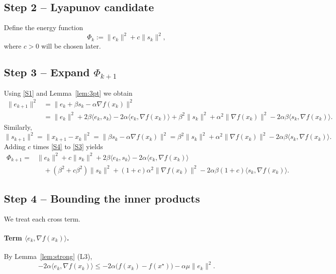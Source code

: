 \documentclass{article}
\begin{document}
\subsection*{Step 2 – Lyapunov candidate}
Define the energy function
\begin{equation}
\Phi_{k}:= \|e_{k}\|^{2}+c\|s_{k}\|^{2},
\tag{S2}
\end{equation}
where $c>0$ will be chosen later.

\subsection*{Step 3 – Expand $\Phi_{k+1}$}
Using \eqref{S1} and Lemma~\ref{lem:3pt} we obtain
\begin{align}
\|e_{k+1}\|^{2}
&=\|e_{k}+\beta s_{k}-\alpha\nabla f(x_{k})\|^{2} \nonumber\\
&=\|e_{k}\|^{2}+2\beta\langle e_{k},s_{k}\rangle
   -2\alpha\langle e_{k},\nabla f(x_{k})\rangle
   +\beta^{2}\|s_{k}\|^{2}
   +\alpha^{2}\|\nabla f(x_{k})\|^{2}
   -2\alpha\beta\langle s_{k},\nabla f(x_{k})\rangle .
\tag{S3}
\end{align}
Similarly,
\begin{equation}
\|s_{k+1}\|^{2}=\|x_{k+1}-x_{k}\|^{2}
           =\| \beta s_{k}-\alpha\nabla f(x_{k})\|^{2}
           =\beta^{2}\|s_{k}\|^{2}+\alpha^{2}\|\nabla f(x_{k})\|^{2}
            -2\alpha\beta\langle s_{k},\nabla f(x_{k})\rangle .
\tag{S4}
\end{equation}
Adding $c$ times \eqref{S4} to \eqref{S3} yields
\begin{align}
\Phi_{k+1}
=&\|e_{k}\|^{2}+c\|s_{k}\|^{2}
   +2\beta\langle e_{k},s_{k}\rangle
   -2\alpha\langle e_{k},\nabla f(x_{k})\rangle  \nonumber\\
&\quad+(\beta^{2}+c\beta^{2})\|s_{k}\|^{2}
   +(1+c)\alpha^{2}\|\nabla f(x_{k})\|^{2}
   -2\alpha\beta(1+c)\langle s_{k},\nabla f(x_{k})\rangle .
\tag{S5}
\end{align}

\subsection*{Step 4 – Bounding the inner products}
We treat each cross term.

\paragraph{Term $\langle e_{k},\nabla f(x_{k})\rangle$.}
By Lemma~\ref{lem:strong} (L3),
\begin{equation}
-2\alpha\langle e_{k},\nabla f(x_{k})\rangle
\le -2\alpha\bigl(f(x_{k})-f(x^{\star})\bigr)
       -\alpha\mu\|e_{k}\|^{2}.
\tag{S6}
\end{equation}
\end{document}
